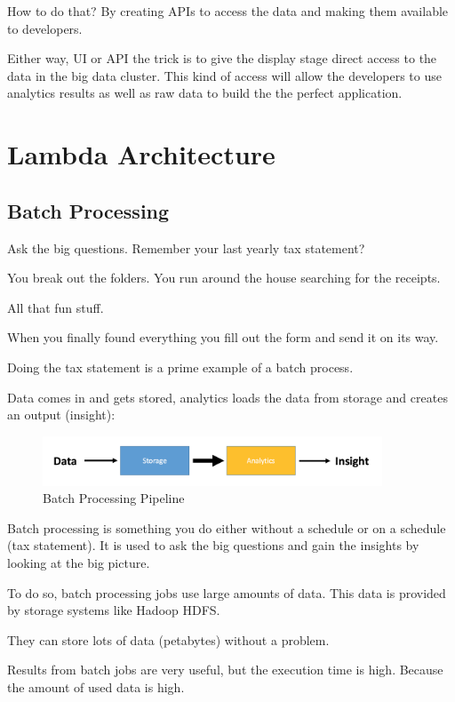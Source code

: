 \documentclass[12pt, numbers=noenddot]{scrreprt} %
\begin{document}
How to do that? By creating APIs to access the data and making them available to developers.

Either way, UI or API the trick is to give the display stage direct access to the data in the big data cluster. This kind of access will allow the developers to use analytics results as well as raw data to build the the perfect application.

\chapter{ Lambda Architecture}

\section{Batch Processing} Ask the big questions. Remember your last yearly tax statement?

You break out the folders. You run around the house searching for the receipts.

All that fun stuff.

When you finally found everything you fill out the form and send it on its way.

Doing the tax statement is a prime example of a batch process.

Data comes in and gets stored, analytics loads the data from storage and creates an output (insight):

\begin{figure}[htbp]
  \centering
     \includegraphics[width=0.9\textwidth]{images/Simple-Batch-Processing-Workflow}
  \caption{Batch Processing Pipeline}
  \label{fig:Bild1}
\end{figure}

Batch processing is something you do either without a schedule or on a schedule (tax statement). It is used to ask the big questions and gain the insights by looking at the big picture.

To do so, batch processing jobs use large amounts of data. This data is provided by storage systems like Hadoop HDFS.

They can store lots of data (petabytes) without a problem.

Results from batch jobs are very useful, but the execution time is high. Because the amount of used data is high.
\end{document}
